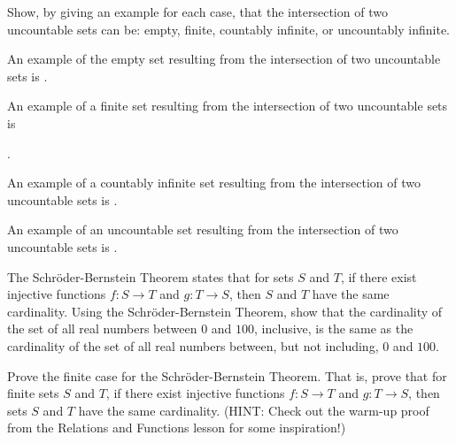 \documentclass[solution, letterpaper]{cs20}
\begin{document}

Show, by giving an example for each case, that the intersection of two uncountable sets can be: empty, finite, countably
infinite, or uncountably infinite.

\begin{solution}
An example of the empty set resulting from the intersection of two uncountable sets is \fbox{$\big[0,1\big] \cap \big[2,3\big] = \emptyset$}.
\newline

\noindent An example of a finite set resulting from the intersection of two uncountable sets is 

\noindent {}.
\newline

\noindent An example of a countably infinite set resulting from the intersection of two uncountable sets is .
\newline

\noindent An example of an uncountable set resulting from the intersection of two uncountable sets is .
\end{solution}

\subproblem The Schr\"{o}der-Bernstein Theorem states that for sets $S$ and $T$, if there exist injective functions $f : S \rightarrow T$ and $g : T \rightarrow S$, then $S$ and $T$ have the same cardinality. Using the Schr\"{o}der-Bernstein Theorem, show that the cardinality of the set of all real numbers between $0$ and $100$, inclusive, is the same as the cardinality of the set of all real numbers between, but not including, $0$ and $100$.

\subproblem Prove the finite case for the Schr\"{o}der-Bernstein Theorem. That is, prove that for finite sets $S$ and $T$, if there exist injective functions $f : S \rightarrow T$ and $g : T \rightarrow S$, then sets $S$ and $T$ have the same cardinality. (HINT: Check out the warm-up proof from the Relations and Functions lesson for some inspiration!)
\end{document}
